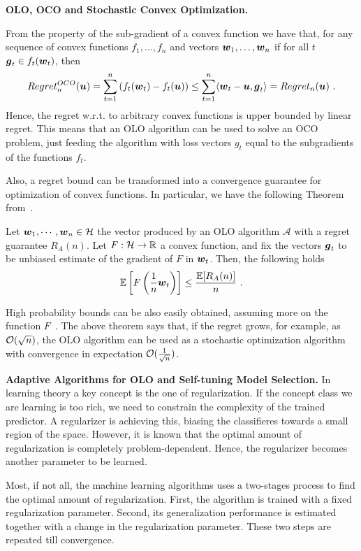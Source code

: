 \textbf{\ac{OLO}, \ac{OCO} and Stochastic Convex Optimization.}

From the property of the sub-gradient of a convex function we have that, for any sequence of convex functions $f_1, \ldots, f_n$ and vectors $\boldsymbol{w}_1,\ldots, \boldsymbol{w}_n$ if for all $t$ $\boldsymbol{g}_t \in f_t(\boldsymbol{w}_t)$, then
\[
Regret^{OCO}_n(\boldsymbol{u}) = \sum_{t=1}^n \left( f_t(\boldsymbol{w}_t) -f_t(\boldsymbol{u})\right) \leq \sum_{t=1}^n \langle \boldsymbol{w}_t-\boldsymbol{u}, \boldsymbol{g}_t\rangle = Regret_n(\boldsymbol{u})~.
\]
Hence, the regret w.r.t. to arbitrary convex functions is upper bounded by linear regret. This means that an \ac{OLO} algorithm can be used to solve an \ac{OCO} problem, just feeding the algorithm with loss vectors $g_t$ equal to the subgradients of the functions $f_t$.

Also, a regret bound can be transformed into a convergence guarantee for optimization of convex functions.
In particular, we have the following Theorem from~\citet{Cesa-BianchiCG04}.
%
\begin{theorem}
Let $\boldsymbol{w}_1, \cdots, \boldsymbol{w}_n \in \mathcal{H}$ the vector produced by an OLO algorithm $\mathcal{A}$ with a regret guarantee $R_A(n)$.
Let $F:\mathcal{H}\rightarrow\mathbb{R}$ a convex function, and fix the vectors $\boldsymbol{g}_t$ to be unbiased estimate of the gradient of $F$ in $\boldsymbol{w}_t$. Then, the following holds
\[
\mathbb{E}\left[F\left(\frac{1}{n} \boldsymbol{w}_t\right)\right] \leq \frac{\mathbb{E}[R_A(n)]}{n}~.
\]
\end{theorem}

High probability bounds can be also easily obtained, assuming more on the function $F$~\citep{Cesa-BianchiCG04}.
The above theorem says that, if the regret grows, for example, as $\mathcal{O}(\sqrt{n})$, the OLO algorithm can be used as a stochastic optimization algorithm with convergence in expectation $\mathcal{O}(\frac{1}{\sqrt{n}})$.


\textbf{Adaptive Algorithms for OLO and Self-tuning Model Selection.}
In learning theory a key concept is the one of regularization. If the concept class we are learning is too rich, we need to constrain the complexity of the trained predictor. A regularizer is achieving this, biasing the classifieres towards a small region of the space. However, it is known that the optimal amount of regularization is completely problem-dependent. Hence, the regularizer becomes another parameter to be learned.

Most, if not all, the machine learning algorithms uses a two-stages process to find the optimal amount of regularization. First, the algorithm is trained with a fixed regularization parameter. Second, its generalization performance is estimated together with a change in the regularization parameter. These two steps are repeated till convergence.


